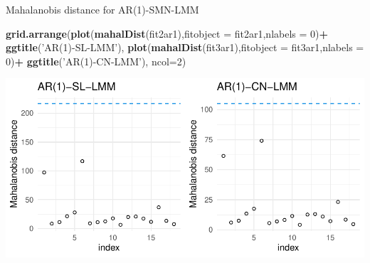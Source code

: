 \documentclass[
  ignorenonframetext,
]{beamer}
\newenvironment{Shaded}{\begin{snugshade}}{\end{snugshade}}
\newcommand{\DataTypeTok}[1]{\textcolor[rgb]{0.13,0.29,0.53}{#1}}
\newcommand{\DecValTok}[1]{\textcolor[rgb]{0.00,0.00,0.81}{#1}}
\newcommand{\KeywordTok}[1]{\textcolor[rgb]{0.13,0.29,0.53}{\textbf{#1}}}
\newcommand{\NormalTok}[1]{#1}
\newcommand{\OperatorTok}[1]{\textcolor[rgb]{0.81,0.36,0.00}{\textbf{#1}}}
\newcommand{\StringTok}[1]{\textcolor[rgb]{0.31,0.60,0.02}{#1}}
\begin{document}
\begin{frame}[fragile]{Mahalanobis distance for AR(1)-SMN-LMM}
\protect\hypertarget{mahalanobis-distance-for-ar1-smn-lmm}{}

\scriptsize

\begin{Shaded}
\begin{Highlighting}[]
\KeywordTok{grid.arrange}\NormalTok{(}\KeywordTok{plot}\NormalTok{(}\KeywordTok{mahalDist}\NormalTok{(fit2ar1),}\DataTypeTok{fitobject =}\NormalTok{ fit2ar1,}\DataTypeTok{nlabels =} \DecValTok{0}\NormalTok{)}\OperatorTok{+}
\StringTok{               }\KeywordTok{ggtitle}\NormalTok{(}\StringTok{'AR(1)-SL-LMM'}\NormalTok{),}
             \KeywordTok{plot}\NormalTok{(}\KeywordTok{mahalDist}\NormalTok{(fit3ar1),}\DataTypeTok{fitobject =}\NormalTok{ fit3ar1,}\DataTypeTok{nlabels =} \DecValTok{0}\NormalTok{)}\OperatorTok{+}
\StringTok{               }\KeywordTok{ggtitle}\NormalTok{(}\StringTok{'AR(1)-CN-LMM'}\NormalTok{),}
             \DataTypeTok{ncol=}\DecValTok{2}\NormalTok{)}
\end{Highlighting}
\end{Shaded}

\begin{center}\includegraphics[width=0.8\linewidth]{codes_files/figure-beamer/mahal1-1} \end{center}

\end{frame}
\end{document}
